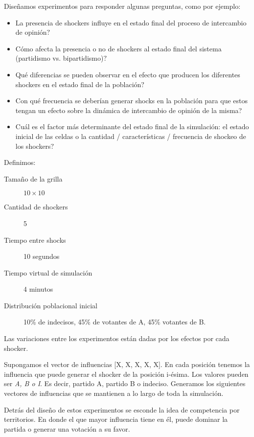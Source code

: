 Diseñamos experimentos para responder algunas preguntas, como por ejemplo:
\begin{itemize}
\item La presencia de shockers influye en el estado final del proceso de intercambio de opinión$?$ 
\item Cómo afecta la presencia o no de shockers al estado final del sistema (partidismo vs. bipartidismo)$?$ 
\item Qué diferencias se pueden observar en el efecto que producen los diferentes shockers en el estado final de la población$?$ 
\item Con qué frecuencia se deberían generar shocks en la población para que estos tengan un efecto sobre la dinámica de intercambio de opinión de la misma?
\item Cuál es el factor más determinante del estado final de la simulación: el estado inicial de las celdas o la cantidad / características / frecuencia de shockeo de los shockers$?$ 
\end{itemize}

Definimos:

\begin{description}
    \item[Tamaño de la grilla]  $10 \times 10$
    \item[Cantidad de shockers] 5
    \item[Tiempo entre shocks] 10 segundos
    \item[Tiempo virtual de simulación] 4 minutos
    \item[Distribución poblacional inicial] 10\% de indecisos, 45\% de votantes de A, 45\% votantes de B.
\end{description}

Las variaciones entre los experimentos están dadas por los efectos por cada shocker.

Supongamos el vector de influencias [X, X, X, X, X]. En cada posición tenemos la influencia que puede generar el shocker de la posición i-ésima. Los valores pueden ser \textit{A, B o I}. Es decir, partido A, partido B o indeciso. Generamos los siguientes vectores de influencias que se mantienen a lo largo de toda la simulación.

Detrás del diseño de estos experimentos se esconde la idea de competencia por territorios. En donde el que mayor influencia tiene en él, puede dominar la partida o generar una votación a su favor.

